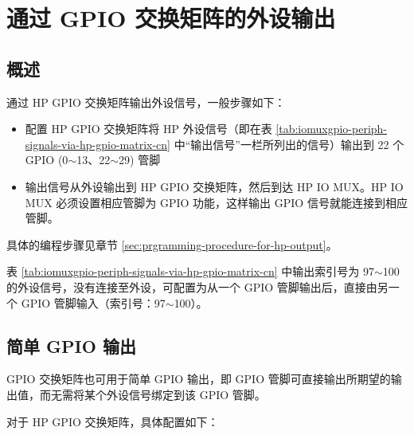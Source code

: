 \documentclass[main\_\_CN.tex]{subfiles}
\begin{document}
\section{通过 GPIO 交换矩阵的外设输出}
\label{sec:peripheral-output-via-gpio-matrix}

\subsection{概述}

通过 HP GPIO 交换矩阵输出外设信号，一般步骤如下：
\begin{itemize}
    \item 配置 HP GPIO 交换矩阵将 HP 外设信号（即在表 \ref{tab:iomuxgpio-periph-signals-via-hp-gpio-matrix-cn} 中``输出信号”一栏所列出的信号）输出到 22 个 GPIO (0$\sim$13、22$\sim$29) 管脚
    \item 输出信号从外设输出到 HP GPIO 交换矩阵，然后到达 HP IO MUX。HP IO MUX 必须设置相应管脚为 GPIO 功能，这样输出 GPIO 信号就能连接到相应管脚。
\end{itemize}

具体的编程步骤见章节 \ref{sec:prgramming-procedure-for-hp-output}。

\begin{tiplisting}
表 \ref{tab:iomuxgpio-periph-signals-via-hp-gpio-matrix-cn} 中输出索引号为 97$\sim$100 的外设信号，没有连接至外设，可配置为从一个 GPIO 管脚输出后，直接由另一个 GPIO 管脚输入（索引号：97$\sim$100）。
\end{tiplisting}
\vspace{-2em}

\subsection{简单 GPIO 输出}
\label{sec:simple-gpio-out}

GPIO 交换矩阵也可用于简单 GPIO 输出，即 GPIO 管脚可直接输出所期望的输出值，而无需将某个外设信号绑定到该 GPIO 管脚。

对于 HP GPIO 交换矩阵，具体配置如下：
\end{document}
